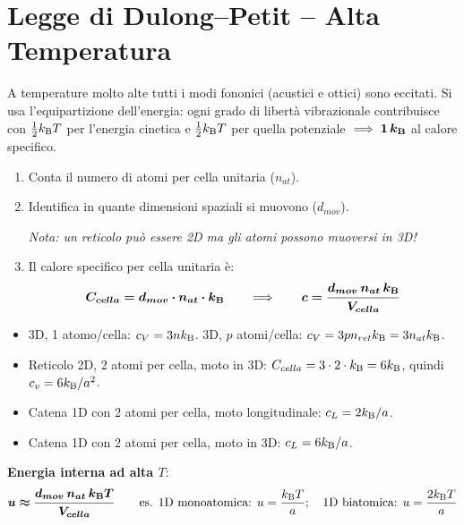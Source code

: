 \section{Legge di Dulong--Petit -- Alta Temperatura}
A temperature molto alte tutti i modi fononici (acustici e ottici) sono eccitati. Si usa l'equipartizione dell'energia: ogni grado di libertà vibrazionale contribuisce con $\frac{1}{2}k_{\mathrm{B}} T$ per l'energia cinetica e $\frac{1}{2}k_{\mathrm{B}} T$ per quella potenziale $\implies \bm{1\,k_{\mathrm{B}}}$ al calore specifico.

\begin{enumerate}
    \item Conta il numero di atomi per cella unitaria ($n_{at}$).
    \item Identifica in quante dimensioni spaziali si muovono ($d_{mov}$).
    
    \textit{Nota: un reticolo può essere 2D ma gli atomi possono muoversi in 3D!}
    \item Il calore specifico per cella unitaria è:
    \[ \bm{C_{cella} = d_{mov}\cdot n_{at}\cdot k_{\mathrm{B}}} \qquad\Longrightarrow\qquad
       \bm{c = \frac{d_{mov}\,n_{at}\,k_{\mathrm{B}}}{V_{cella}} } \]
\end{enumerate}

\begin{itemize}
  \item 3D, 1 atomo/cella: $c_V = 3nk_{\mathrm{B}}$. \quad 3D, $p$ atomi/cella: $c_V = 3pn_{ret}k_{\mathrm{B}} = 3 n_{at}k_{\mathrm{B}}$.
  \item Reticolo 2D, 2 atomi per cella, moto in 3D: $C_{cella}=3\cdot2\cdot k_{\mathrm{B}} = 6k_{\mathrm{B}}$, quindi $c_v = 6k_{\mathrm{B}}/a^2$.
  \item Catena 1D con 2 atomi per cella, moto longitudinale: $c_L = 2k_{\mathrm{B}}/a$.
  \item Catena 1D con 2 atomi per cella, moto in 3D: $c_L = 6k_{\mathrm{B}}/a$.
\end{itemize}
\noindent\textbf{Energia interna ad alta $T$}:
\[ \bm{u \approx \frac{d_{mov}\,n_{at}\,k_{\mathrm{B}} T}{V_{cella}}}\qquad\text{es. 1D monoatomica: } u=\frac{k_{\mathrm{B}} T}{a};
   \quad\text{1D biatomica: } u = \frac{2k_{\mathrm{B}} T}{a} \]

